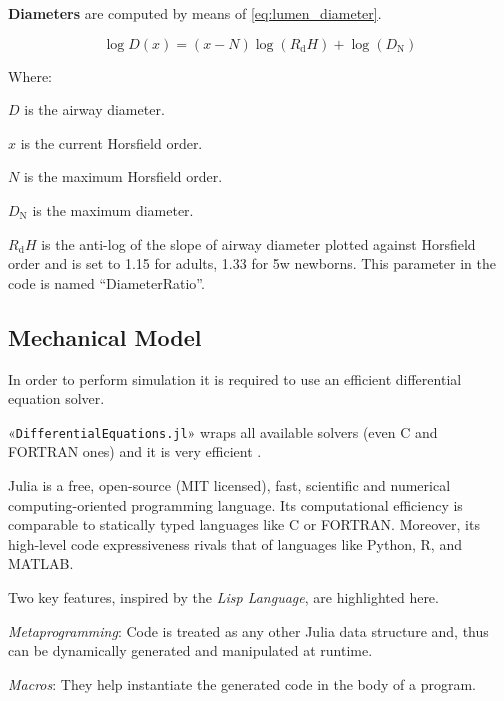 
\textbf{Diameters} are computed by means of \cref{eq:lumen_diameter}.

\begin{equation}
  \log D(x) = (x - N)\log(R_{\text{d}} H) + \log(D_{\text{N}})
  \label{eq:lumen_diameter}
\end{equation}

Where:
\begin{description}
\item $D$ is the airway diameter.
\item $x$ is the current Horsfield order.
\item $N$ is the maximum Horsfield order.
\item $D_{\text{N}}$ is the maximum diameter.
\item $R_{\text{d}} H$ is the anti-log of the slope of airway diameter
  plotted against Horsfield order and is set to 1.15 for adults, 1.33
  for 5w newborns\cite[][Tab. 2]{horsfield1987}.  This parameter in
  the code is named ``DiameterRatio''.
\end{description}
  
\subsection{Mechanical Model}
\label{subsec:simulator_development}

In order to perform simulation it is required to use an efficient
differential equation solver.

«\texttt{DifferentialEquations.jl}» wraps all available solvers (even
C and FORTRAN ones) and it is very efficient
\cite{diffeqdocs2024,rackauckas2017}.

Julia is a free, open-source (MIT licensed), fast, scientific and
numerical computing-oriented programming language.  Its computational
efficiency is comparable to statically typed languages like C
or FORTRAN.  Moreover, its high-level code expressiveness rivals that of
languages like Python, R, and MATLAB\cite{juliadocs2024}.

Two key features, inspired by the \emph{Lisp Language}, are
highlighted here.

\begin{description}
\item \emph{Metaprogramming}: Code is treated as any other Julia data
  structure and, thus can be dynamically generated and manipulated at
  runtime.
\item \emph{Macros}: They help instantiate the generated code in the
  body of a program.
\end{description}

